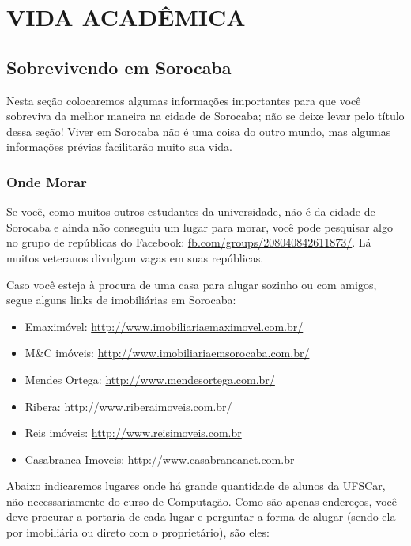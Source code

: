 \section{VIDA ACADÊMICA}
\subsection{Sobrevivendo em Sorocaba}
Nesta seção colocaremos algumas informações importantes para que você sobreviva da melhor maneira na cidade de Sorocaba; não se deixe levar pelo título dessa seção! Viver em Sorocaba não é uma coisa do outro mundo, mas algumas informações prévias facilitarão muito sua vida.

\subsubsection{Onde Morar}
Se você, como muitos outros estudantes da universidade, não é da cidade de Sorocaba e ainda não conseguiu um lugar para morar, você pode pesquisar algo no grupo de repúblicas do Facebook: \url{fb.com/groups/208040842611873/}. Lá muitos veteranos divulgam vagas em suas repúblicas.

Caso você esteja à procura de uma casa para alugar sozinho ou com amigos, segue alguns links de imobiliárias em Sorocaba:

\begin{itemize}
  \item Emaximóvel: \url{http://www.imobiliariaemaximovel.com.br/}
  \item M\&C imóveis: \url{http://www.imobiliariaemsorocaba.com.br/}
  \item Mendes Ortega: \url{http://www.mendesortega.com.br/}
  \item Ribera: \url{http://www.riberaimoveis.com.br/}
  \item Reis imóveis: \url{http://www.reisimoveis.com.br}
  \item Casabranca Imoveis: \url{http://www.casabrancanet.com.br}
\end{itemize}

Abaixo indicaremos lugares onde há grande quantidade de alunos da UFSCar, não
necessariamente do curso de Computação. Como são apenas endereços, você deve
procurar a portaria de cada lugar e perguntar a forma de alugar (sendo ela por
imobiliária ou direto com o proprietário), são eles:

